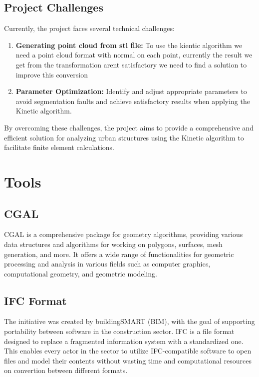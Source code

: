 \documentclass{article}
\begin{document}
\subsection{Project Challenges}

Currently, the project faces several technical challenges:

\begin{enumerate}
    \item \textbf{Generating point cloud from stl file:} To use the kientic algorithm we need a point cloud format with normal on each point, 
    currently the result we get from the transformation arent satisfactory we need to find a solution to improve this conversion
    
    \item \textbf{Parameter Optimization:} Identify and adjust appropriate 
    parameters to avoid segmentation faults and achieve satisfactory results 
    when applying the Kinetic algorithm.
\end{enumerate}

By overcoming these challenges, the project aims to provide a 
comprehensive and efficient solution for analyzing urban structures 
using the Kinetic algorithm to facilitate finite element calculations.\newline

\section{Tools}
\subsection{CGAL}
CGAL is a comprehensive package for geometry algorithms, providing various data structures and algorithms for working on polygons, surfaces, mesh generation, and more.
It offers a wide range of functionalities for geometric processing and analysis in various fields such as computer graphics, computational geometry, and geometric modeling.
\subsection{IFC Format}

The initiative was created by buildingSMART (BIM), with the goal of supporting portability between software in the construction sector.
 IFC is a file format designed to replace a fragmented information system with a standardized one.
  This enables every actor in the sector to utilize IFC-compatible software to open files and model their contents without wasting time and computational resources on convertion between different formats.
\end{document}
